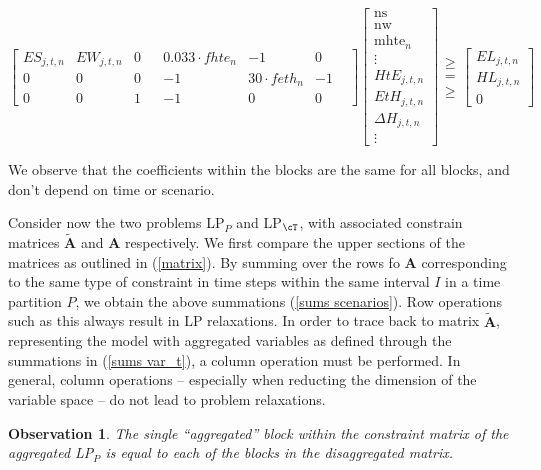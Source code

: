 \documentclass[smallextended,natbib]{svjour3}       %
\newtheorem{observation}[theorem]{Observation}
\numberwithin{definition}{section}
\numberwithin{theorem}{section}
\numberwithin{proposition}{section}
\begin{document}
\begin{equation}
\left[
\begin{array}{ccc|ccccc}
    ES_{j,t,n} & EW_{j,t,n} &0& & 0.033\cdot fhte_{n} & -1 & 0 & \\
    0          & 0          &0&  & -1  & 30\cdot feth_n & -1 & \\
    0          & 0          &1 &  & -1   & 0 & 0 &
\end{array}
\right]
  \begin{bmatrix}
    \text{ns}  \\
    \text{nw} \\
    \text{mhte$_n$} \\
    \hline
    \vdots \\
    HtE_{j,t,n} \\
    EtH_{j,t,n} \\
    \Delta H_{j,t,n}\\
    \vdots
  \end{bmatrix}
  \begin{matrix}
  \geq \\
  =\\
  \geq
  \end{matrix}
  \begin{bmatrix}
    EL_{j,t,n} \\
    HL_{j,t,n} \\
    0
  \end{bmatrix}
  \end{equation}  

We observe that the coefficients within the blocks are the same for all blocks, and don't depend on time or scenario.

Consider now the two problems LP$_P$ and LP$_{\cT}$, with associated constrain matrices $\tilde{\mathbf{A}}$ and $\mathbf{A}$ respectively.  We first compare the upper sections of the matrices as outlined in (\ref{matrix}). 
By summing over the rows fo $\mathbf{A}$ corresponding to the same type of constraint in time steps within the same interval $I$ in a time partition $P$, we obtain the above summations (\ref{sums scenarios}). 
Row operations such as this always result in LP relaxations. 
In order to trace back to matrix $\tilde{\mathbf{A}}$, representing the model with aggregated variables as defined through the summations in (\ref{sums var_t}), a column operation must be performed. 
In general, column operations -- especially when reducting the dimension of the variable space -- do not lead to problem relaxations. 
\begin{observation}
  The single ``aggregated'' block within the constraint matrix of the aggregated LP$_{P}$ is equal to each of the blocks in the disaggregated matrix.
\end{observation}
\end{document}
